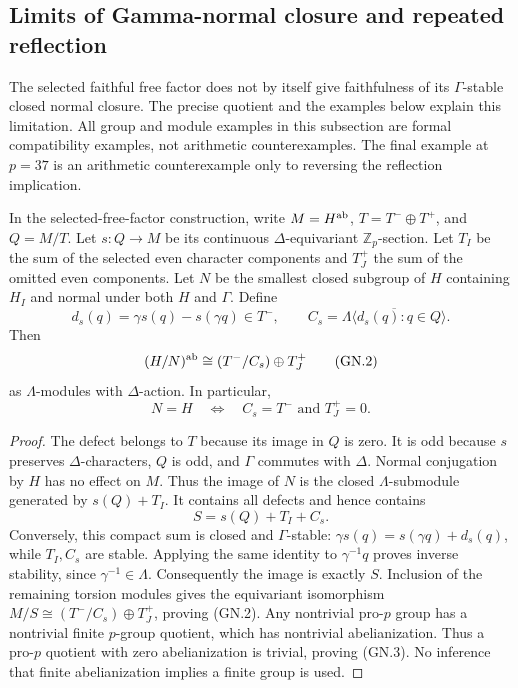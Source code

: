 \subsection{Limits of Gamma-normal closure and repeated reflection}
\label{sec:selected-gamma-limits}

The selected faithful free factor does not by itself give faithfulness
of its \(\Gamma\)-stable closed normal closure. The precise quotient
and the examples below explain this limitation. All group and module
examples in this subsection are formal compatibility examples, not
arithmetic counterexamples. The final example at \(p=37\) is an
arithmetic counterexample only to reversing the reflection implication.

\begin{proposition}
\label{prop:gamma-normal-closure}
In the selected-free-factor construction, write
\(M=H^{\rm ab}\), \(T=T^-\oplus T^+\), and \(Q=M/T\).
Let \(s:Q\to M\) be its continuous \(\Delta\)-equivariant
\(\mathbb Z_p\)-section. Let \(T_I\) be the sum of the selected
even character components and \(T_J^+\) the sum of the omitted
even components. Let \(N\) be the smallest closed subgroup of
\(H\) containing \(H_I\) and normal under both \(H\) and
\(\Gamma\). Define
\[
 d_s(q)=\gamma s(q)-s(\gamma q)\in T^-,\qquad
 C_s=\overline{\Lambda\langle d_s(q):q\in Q\rangle}.
 \tag{GN.1}
\]
Then
\[
 (H/N)^{\rm ab}\cong (T^-/C_s)\oplus T_J^+
 \tag{GN.2}
\]
as \(\Lambda\)-modules with \(\Delta\)-action. In particular,
\[
 N=H\quad\Longleftrightarrow\quad C_s=T^-\text{ and }T_J^+=0.
 \tag{GN.3}
\]
\end{proposition}

\begin{proof}
The defect belongs to \(T\) because its image in \(Q\) is zero.
It is odd because \(s\) preserves \(\Delta\)-characters,
\(Q\) is odd, and \(\Gamma\) commutes with \(\Delta\).
Normal conjugation by \(H\) has no effect on \(M\). Thus the
image of \(N\) is the closed \(\Lambda\)-submodule generated
by \(s(Q)+T_I\). It contains all defects and hence contains
\[
 S=s(Q)+T_I+C_s.
\]
Conversely, this compact sum is closed and \(\Gamma\)-stable:
\(\gamma s(q)=s(\gamma q)+d_s(q)\), while \(T_I,C_s\) are
stable. Applying the same identity to \(\gamma^{-1}q\) proves
inverse stability, since \(\gamma^{-1}\in\Lambda\). Consequently
the image is exactly \(S\). Inclusion of the remaining torsion
modules gives the equivariant isomorphism
\(M/S\cong (T^-/C_s)\oplus T_J^+\), proving (GN.2).
Any nontrivial pro-\(p\) group has a nontrivial finite \(p\)-group
quotient, which has nontrivial abelianization. Thus a pro-\(p\)
quotient with zero abelianization is trivial, proving (GN.3).
No inference that finite abelianization implies a finite group is used.
\end{proof}

